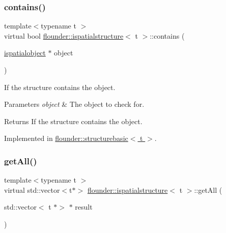 \mbox{\label{classflounder_1_1ispatialstructure_a80e36c5dca0995c27d7222e3c3fc1b90}} 
\subsubsection{\texorpdfstring{contains()}{contains()}}
{\footnotesize\ttfamily template$<$typename t $>$ \\
virtual bool \hyperlink{classflounder_1_1ispatialstructure}{flounder\+::ispatialstructure}$<$ t $>$\+::contains (\begin{DoxyParamCaption}\item[{\hyperlink{classflounder_1_1ispatialobject}{ispatialobject} $\ast$}]{object }\end{DoxyParamCaption})\hspace{0.3cm}{\ttfamily [pure virtual]}}



If the structure contains the object. 


\begin{DoxyParams}{Parameters}
{\em object} & The object to check for. \\
\hline
\end{DoxyParams}
\begin{DoxyReturn}{Returns}
If the structure contains the object. 
\end{DoxyReturn}


Implemented in \hyperlink{classflounder_1_1structurebasic_ac9a9bcd40d564056c33c2ade540f4e4c}{flounder\+::structurebasic$<$ t $>$}.

\mbox{\label{classflounder_1_1ispatialstructure_a34a6ce64313ee41c5c188c9359997798}} 
\subsubsection{\texorpdfstring{get\+All()}{getAll()}}
{\footnotesize\ttfamily template$<$typename t $>$ \\
virtual std\+::vector$<$t$\ast$$>$ \hyperlink{classflounder_1_1ispatialstructure}{flounder\+::ispatialstructure}$<$ t $>$\+::get\+All (\begin{DoxyParamCaption}\item[{std\+::vector$<$ t $\ast$$>$ $\ast$}]{result }\end{DoxyParamCaption})\hspace{0.3cm}{\ttfamily [pure virtual]}}



